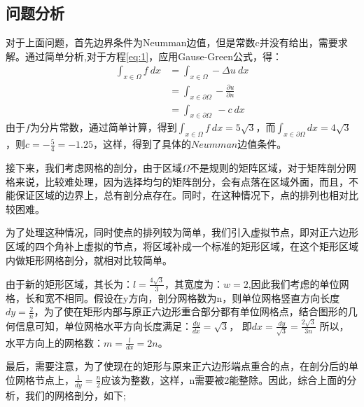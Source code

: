 \documentclass[a4paper,11pt]{ctexart} %
\begin{document}
\subsection{问题分析}
对于上面问题，首先边界条件为Neumman边值，但是常数c并没有给出，需要求解。通过简单分析,对于方程\eqref{eq:1}，应用Gause-Green公式，得：
\begin{equation}
\begin{aligned}
\label{eq:2}
\int_{x\in\Omega} f\ dx&= \int_{x\in\Omega} -\Delta u\ dx \\
                       &=\int_{x\in\partial\Omega} -\frac{\partial u}{\partial n}\\
		       &=\int_{x\in\partial\Omega}\ -c\ dx
\end{aligned}
\end{equation}
由于$f$为分片常数，通过简单计算，得到$\int_{x\in\Omega}f\ dx=5\sqrt{3}$，而$\int_{x\in\partial\Omega}dx=4\sqrt{3}$，则$c=-\frac{5}{4}=-1.25$，这样，得到了具体的$Neumman$边值条件。\par
接下来，我们考虑网格的剖分，由于区域$\Omega$不是规则的矩阵区域，对于矩阵剖分网格来说，比较难处理，因为选择均匀的矩阵剖分，会有点落在区域外面，而且，不能保证区域的边界上，总有剖分点存在。同时，在这种情况下，点的排列也相对比较困难。\par
为了处理这种情况，同时使点的排列较为简单，我们引入虚拟节点，即对正六边形区域的四个角补上虚拟的节点，将区域补成一个标准的矩形区域，在这个矩形区域内做矩形网格剖分，就相对比较简单。\par
由于新的矩形区域，其长为：$l=\frac{4\sqrt{3}}{3}$，其宽度为：$w=2$,因此我们考虑的单位网格，长和宽不相同。假设在y方向，剖分网格数为n，则单位网格竖直方向长度$dy=\frac{2}{n}$，为了使在矩形内部与原正六边形重合部分都有单位网格点，结合图形的几何信息可知，单位网格水平方向长度满足：$\frac{dy}{dx}=\sqrt{3}$，
即$dx=\frac{dy}{\sqrt{3}}=\frac{2\sqrt{3}}{3n}$
所以，水平方向上的网格数：$m=\frac{l}{dx}=2n$。\par
最后，需要注意，为了使现在的矩形与原来正六边形端点重合的点，在剖分后的单位网格节点上，$\frac{1}{dy}=\frac{n}{2}$应该为整数，这样，n需要被2能整除。因此，综合上面的分析，我们的网格剖分，如下;
\end{document}
